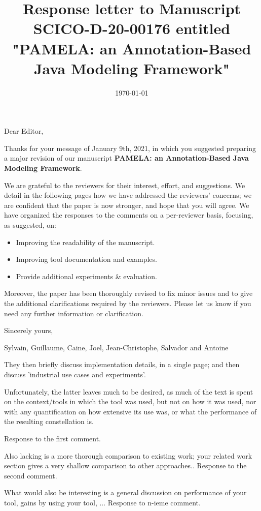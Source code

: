 \documentclass[10pt]{article}
\title{Response letter to Manuscript SCICO-D-20-00176 entitled "PAMELA: an Annotation-Based Java Modeling Framework"}
\date{\today}
\begin{document}
Dear Editor,

\bigskip
Thanks for your message of January 9th, 2021, in which you suggested preparing a major revision of our manuscript  \textbf{PAMELA: an Annotation-Based Java Modeling Framework}. 

\bigskip
We are grateful to the reviewers for their interest, effort, and suggestions. We detail in the following pages how we have addressed the reviewers' concerns; we are confident that the paper is now stronger, and hope that you will agree. We have organized the responses to the comments on a per-reviewer basis, focusing, as suggested, on: 

\begin{itemize}
\item Improving the readability of the manuscript. 
\item Improving tool documentation and examples.
\item Provide additional experiments \& evaluation.
\end{itemize}

Moreover, the paper has been thoroughly revised to fix minor issues and to give the additional clarifications required by the reviewers. Please let us know if you need any further information or clarification.

\bigskip
Sincerely yours,

\bigskip
Sylvain, Guillaume, Caine, Joel, Jean-Christophe, Salvador and Antoine

\pagebreak


\begin{response}{They then briefly discuss implementation details, in a single page; and then discuss 'industrial use cases and experiments'.

Unfortunately, the latter leaves much to be desired, as much of the text is spent on the context/tools in which the tool was used, but not on how it was used, nor with any quantification on how extensive its use was, or what the performance of the resulting constellation is.
}
  Response to the first comment.
\end{response}
\begin{response}{Also lacking is a more thorough comparison to existing work; your related work section gives a very shallow comparison to other approaches..}
  Response to the second comment.
\end{response}

\begin{response}{What would also be interesting is a general discussion on performance of your tool, gains by using your tool, ...
}
  Response to n-ieme comment.
\end{response}
\end{document}
